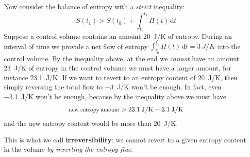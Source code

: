 \documentclass[a4paper,12pt,%
onecolumn,oneside,%
british%
]{memoir}
\newcommand*{\di}{\mathrm{d}}%
\renewcommand*{\|}[1][]{\nonscript\:#1\vert\nonscript\:\mathopen{}}
\newcommand*{\yti}{t_{0}}
\newcommand*{\ytf}{t_{1}}
\newcommand*{\dt}{\di t}
\newcommand*{\yS}{S}
\newcommand*{\yB}{\varPi}
\begin{document}
Now consider the balance of entropy with a \emph{strict} inequality:
\begin{equation*}
  \yS(\ytf) > \yS(\yti) + \int_{\yti}^{\ytf}\!\!\yB(t)\,\dt
\end{equation*}
%
%
Suppose a control volume contains an amount \qty{20}{J/K} of entropy. During an interval of time we provide a net flow of entropy $\int_{\yti}^{\ytf}\!\!\yB(t)\,\dt = \qty{3}{J/K}$ into the control volume. By the inequality above, at the end we \emph{cannot} have an amount \qty{23}{J/K} of entropy in the control volume: we must have a larger amount, for instance \qty{23.1}{J/K}. If we want to revert to an entropy content of \qty{20}{J/K}, then simply reversing the total flow to \qty{-3}{J/K} won't be enough.
In fact, even \qty{-3.1}{J/K} won't be enough, because by the inequality above we must have
\begin{equation*}
  \text{\footnotesize new entropy amount} > \qty{23.1}{J/K} - \qty{3.1}{J/K}
\end{equation*}
and the new entropy content would be more than \qty{20}{J/K}.

This is what we call \textbf{irreversibility}: we cannot revert to a given entropy content in the volume \emph{by inverting the entropy flux}.
\end{document}
